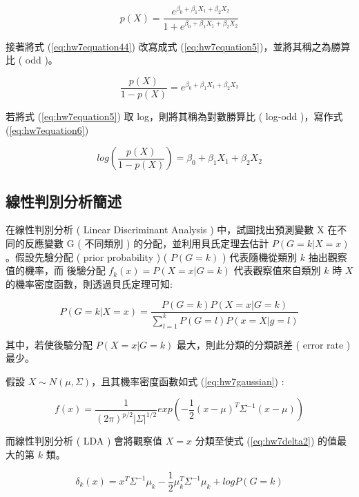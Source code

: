 \begin{equation}\label{eq:hw7equation44}
p(X)=\frac{e^{\beta_0+\beta_1 X_1 + \beta_2 X_2}}{1+e^{\beta_0+\beta_1 X_1 + \beta_2 X_2}}
\end{equation}

接著將式 (\ref{eq:hw7equation44}) 改寫成式 (\ref{eq:hw7equation5})，並將其稱之為勝算比 ( odd )。

\begin{equation}\label{eq:hw7equation5}
\frac{p(X)}{1-p(X)}=e^{\beta_0+\beta_1 X_1 + \beta_2 X_2}
\end{equation}

若將式 (\ref{eq:hw7equation5}) 取 log，則將其稱為對數勝算比 ( log-odd )，寫作式 (\ref{eq:hw7equation6})

\begin{equation}\label{eq:hw7equation6}
log(\frac{p(X)}{1-p(X)})=\beta_0+\beta_1 X_1 + \beta_2 X_2
\end{equation}


\subsection{線性判別分析簡述}

在線性判別分析 ( Linear Discriminant Analysis ) 中，試圖找出預測變數 X 在不同的反應變數 G ( 不同類別 ) 的分配，並利用貝氏定理去估計 $P(G=k|X=x)$。假設先驗分配 ( prior probability ) ( $P(G=k)$ ) 代表隨機從類別 $k$ 抽出觀察值的機率，而 後驗分配 $f_k(x)=P(X=x|G=k)$ 代表觀察值來自類別 $k$ 時 $X$ 的機率密度函數，則透過貝氏定理可知:

\begin{equation}
P(G=k|X=x)=\frac{P(G=k)P(X=x|G=k)}{\sum_{l=1}^{k}P(G=l)P(x=X|g=l)}
\end{equation}

其中，若使後驗分配 $P(X=x|G=k)$ 最大，則此分類的分類誤差 ( error rate )最少。

假設 $X \sim N(\mu, \Sigma)$，且其機率密度函數如式 (\ref{eq:hw7gaussian}) :

\begin{equation}\label{eq:hw7gaussian}
f(x)=\frac{1}{(2\pi)^{p/2}\left|\Sigma\right|^{1/2}}exp(-\frac{1}{2}(x-\mu)^{T}\Sigma^{-1}(x-\mu))
\end{equation}

而線性判別分析 ( LDA ) 會將觀察值 $X=x$ 分類至使式 (\ref{eq:hw7delta2}) 的值最大的第 $k$ 類。

\begin{equation}\label{eq:hw7delta2}
\delta_k(x)=x^{T}\Sigma^{-1}\mu_k-\frac{1}{2}\mu_k^{T}\Sigma^{-1}\mu_k+log P(G=k)
\end{equation}

